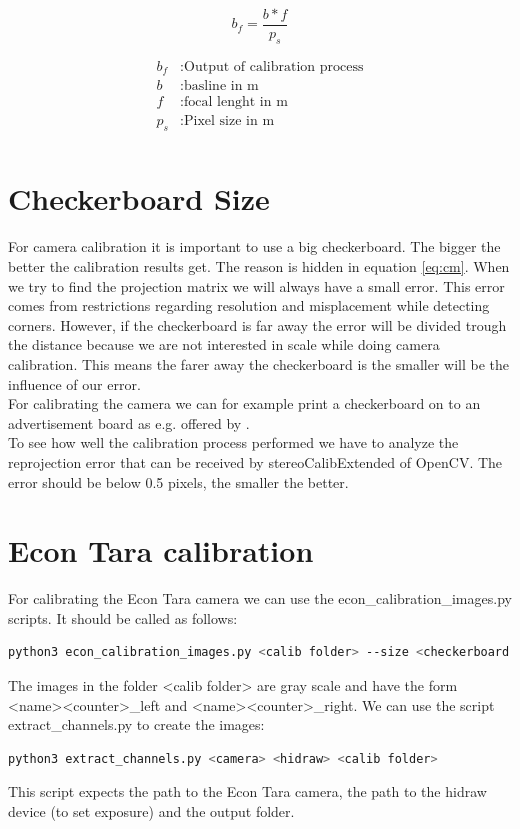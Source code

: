 \documentclass[11pt,a4paper,titlepage,oneside]{report}
\begin{document}
\begin{equation}\label{eq:bf}
	b_f=\frac{b*f}{p_s}
\end{equation}

\begin{align*}
	b_f &:	\text{Output of calibration process}\\
	b &:		\text{basline in m}\\
	f &:		\text{focal lenght in m}\\
	p_s &:	\text{Pixel size in m}\\
\end{align*}

\section{Checkerboard Size}

For camera calibration it is important to use a big checkerboard. The bigger the better the calibration results get. The reason is hidden in equation \ref{eq:cm}. When we try to find the projection matrix we will always have a small error. This error comes from restrictions regarding resolution and misplacement while detecting corners. However, if the checkerboard is far away the error will be divided trough the distance because we are not interested in scale while doing camera calibration. This means the farer away the checkerboard is the smaller will be the influence of our error.\\
For calibrating the camera we can for example print a checkerboard on to an advertisement board as e.g. offered by \cite{mydisplay}.\\
To see how well the calibration process performed we have to analyze the reprojection error that can be received by stereoCalibExtended of OpenCV. The error should be below 0.5 pixels, the smaller the better.

\section{Econ Tara calibration}
For calibrating the Econ Tara camera we can use the econ\_calibration\_images.py scripts. It should be called as follows:
\begin{lstlisting}[language=bash]
python3 econ_calibration_images.py <calib folder> --size <checkerboard filed size>
\end{lstlisting}

The images in the folder <calib folder> are gray scale and have the form <name><counter>\_left and <name><counter>\_right. We can use the script extract\_channels.py to create the images:
\begin{lstlisting}[language=bash]
python3 extract_channels.py <camera> <hidraw> <calib folder>
\end{lstlisting}
This script expects the path to the Econ Tara camera, the path to the hidraw device (to set exposure) and the output folder.
\end{document}
